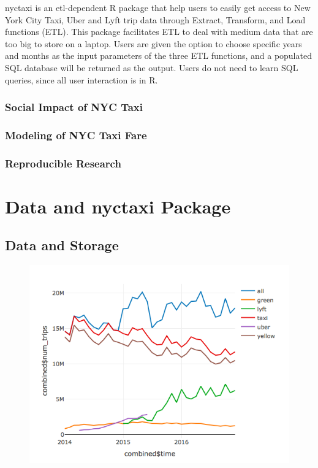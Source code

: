 \documentclass[12pt,twoside]{reedthesis}
\theoremstyle{definition}
\theoremstyle{definition}
\theoremstyle{definition}
\theoremstyle{remark}
\begin{document}
nyctaxi is an etl-dependent R package that help users to easily get
access to New York City Taxi, Uber and Lyft trip data through Extract,
Transform, and Load functions (ETL). This package facilitates ETL to
deal with medium data that are too big to store on a laptop. Users are
given the option to choose specific years and months as the input
parameters of the three ETL functions, and a populated SQL database will
be returned as the output. Users do not need to learn SQL queries, since
all user interaction is in R.

\subsection{Social Impact of NYC Taxi}\label{social-impact-of-nyc-taxi}

\subsection{Modeling of NYC Taxi Fare}\label{modeling-of-nyc-taxi-fare}

\subsection{Reproducible Research}\label{reproducible-research}

\chapter{Data and nyctaxi Package}\label{chapter1}

\section{Data and Storage}\label{data-and-storage}
\begin{figure}
\centering
\includegraphics{figure/Num_trips_summary.png}
\caption{}
\end{figure}
\end{document}
